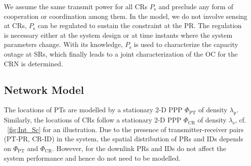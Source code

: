 \documentclass[conference, twocolumn]{IEEEtran}
\newcommand{\sub}[1]{_{\text{#1}}}
\begin{document}
We assume the same transmit power for all CRs $P\sub{s}$ and preclude any form of cooperation or coordination among them. In the model, we do not involve sensing at CRs, $P\sub{s}$ can be regulated to sustain the constraint at the PR. The regulation is necessary either at the system design or at time instants where the system parameters change. With its knowledge, $P\sub{s}$ is used to characterize the capacity outage at SRs, which finally leads to a joint characterization of the OC for the CRN is determined.  
\subsection{Network Model}
The locations of PTs are modelled by a stationary 2-D PPP $\Phi\sub{PT}$ of density $\lambda\sub{p}$. Similarly, the locations of CRs follow a stationary 2-D PPP $\Phi\sub{CR}$ of density $\lambda\sub{s}$, cf. \figurename~\ref{fig:Int_Sc} for an illustration. Due to the presence of transmitter-receiver pairs (PT-PR, CR-ID) in the system, the spatial distribution of PRs and IDs depends on $\Phi\sub{PT}$ and $\Phi\sub{CR}$. However, for the downlink PRs and IDs do not affect the system performance and hence do not need to be modelled. 
\end{document}
